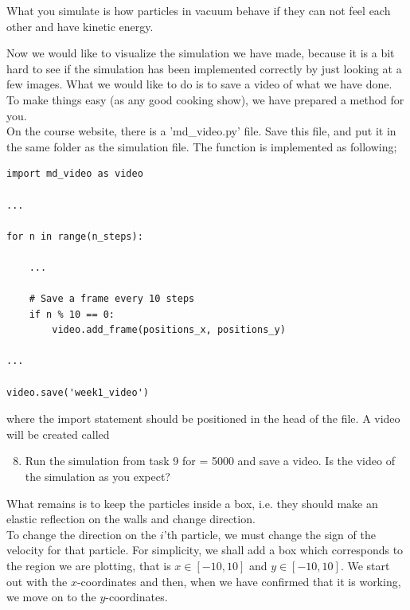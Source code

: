 \documentclass{article}
\begin{document}
What you simulate is how particles in vacuum behave if they can not feel each other and have kinetic energy.\\

\newpage

Now we would like to visualize the simulation we have made, because it is a bit hard to see if the simulation has been implemented correctly by just looking at a few images.
What we would like to do is to save a video of what we have done.
To make things easy (as any good cooking show), we have prepared a method for you.\\

On the course website, there is a 'md\_video.py' file.
Save this file, and put it in the same folder as the simulation file.
The function is implemented as following;

\begin{lstlisting}
import md_video as video

...

for n in range(n_steps):

    ...

    # Save a frame every 10 steps
    if n % 10 == 0:
        video.add_frame(positions_x, positions_y)

...

video.save('week1_video')

\end{lstlisting}

where the import statement should be positioned in the head of the file.
A video will be created called 

\begin{enumerate}
  \setcounter{enumi}{7}
  \item Run the simulation from task 9 for  = 5000 and save a video.
    Is the video of the simulation as you expect?

\end{enumerate}

What remains is to keep the particles inside a box, i.e. they should make an elastic reflection on the walls and change direction. \\

To change the direction on the $i$'th particle, we must change the sign of the velocity for that particle.
For simplicity, we shall add a box which corresponds to the region we are plotting, that is $x \in [-10,10]$ and $y \in [-10,10]$.
We start out with the $x$-coordinates and then, when we have confirmed that it is working, we move on to the $y$-coordinates.
\end{document}
